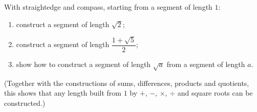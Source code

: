 With straightedge and compass, starting from a segment of length $1$:
\begin{enumerate}
\item[(a)] construct a segment of length $\sqrt2$;
\item[(b)] construct a segment of length $\dfrac{1+\sqrt5}{2}$;
\item[(c)] show how to construct a segment of length $\sqrt a$ from a segment of length $a$.
\end{enumerate}
(Together with the constructions of sums, differences, products and quotients, this shows that any length built from $1$ by $+$, $-$, $\times$, $\div$ and square roots can be constructed.)
